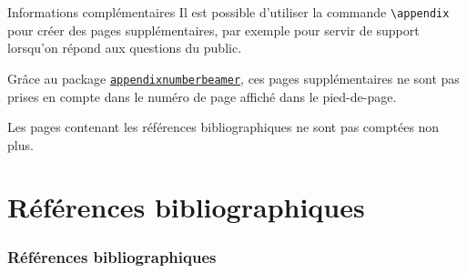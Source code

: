 \documentclass[10pt,    %
    french,             %
    xcolor=table,       %
    envcountsect,       %
    aspectratio=43      %
]{beamer}
\begin{document}
\begin{frame}{Informations complémentaires}
	Il est possible d'utiliser la commande \texttt{\textbackslash{}appendix} pour créer des pages supplémentaires, par exemple pour servir de support lorsqu'on répond aux questions du public. 
	
    \vspace{0.25cm}
	Grâce au package \href{https://ctan.org/pkg/appendixnumberbeamer?lang=en}{\texttt{appendixnumberbeamer}}, ces pages supplémentaires ne sont pas prises en compte dans le numéro de page affiché dans le pied-de-page.
	
    \vspace{0.25cm}
	Les pages contenant les références bibliographiques ne sont pas comptées non plus.
\end{frame}

\section{Références bibliographiques}
\label{sec:biblio}
\sectionframe

\begin{frame}[t,allowframebreaks]
    \frametitle{Références bibliographiques}
    
    \printbibliography
\end{frame}



\end{document}
